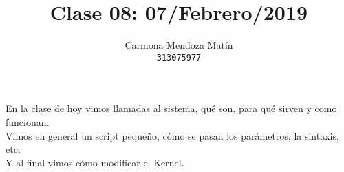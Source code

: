 \documentclass[11pt, a4paper]{report}
\begin{document}
\title{Clase 08: 07/Febrero/2019}
\author{
  Carmona Mendoza Mat\'in\\
  \texttt{313075977}
}
\date{}
\maketitle

En la clase de hoy vimos llamadas al sistema, qu\'e son, para qu\'e sirven y como funcionan. \\

Vimos en general un script pequeño, c\'omo se pasan los par\'ametros, la sintaxis, etc. \\

Y al final vimos c\'omo modificar el Kernel.
\end{document}
